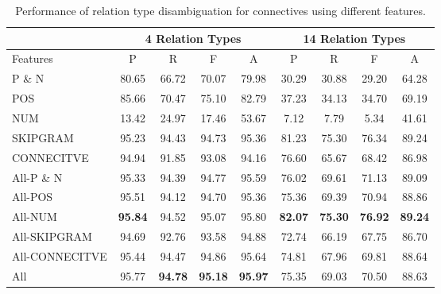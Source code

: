 \begin{table}[ht]
\centering
\begin{tabular}{|l|c|c|c|c|c|c|c|c|}
\hline
                  & \multicolumn{4}{c|}{4 Relation Types}      & \multicolumn{4}{c|}{14 Relation Types}                                    \\ \hline
    Features      &     P         &     R      &     F         &     A         &     P         &     R      &     F        &     A         \\ \hline
    P \& N        &     80.65     &     66.72  &     70.07     &     79.98     &     30.29     &     30.88  &     29.20    &     64.28     \\ \hline
    POS           &     85.66     &     70.47  &     75.10     &     82.79     &     37.23     &     34.13  &     34.70    &     69.19     \\ \hline
    NUM           &     13.42     &     24.97  &     17.46     &     53.67     &      7.12     &      7.79  &      5.34    &     41.61     \\ \hline
    SKIPGRAM      &     95.23     &     94.43  &     94.73     &     95.36     &     81.23     &     75.30  &     76.34    &     89.24     \\ \hline
    CONNECITVE    &     94.94     &     91.85  &     93.08     &     94.16     &     76.60     &     65.67  &     68.42    &     86.98     \\ \hline
    All-P \& N    &     95.33     &     94.39  &     94.77     &     95.59     &     76.02     &     69.61  &     71.13    &     89.09     \\ \hline
    All-POS       &     95.51     &     94.12  &     94.70     &     95.36     &     75.36     &     69.39  &     70.94    &     88.86     \\ \hline
    All-NUM       & \bf 95.84     &     94.52  &     95.07     &     95.80     & \bf 82.07     & \bf 75.30  & \bf 76.92    & \bf 89.24     \\ \hline
    All-SKIPGRAM  &     94.69     &     92.76  &     93.58     &     94.88     &     72.74     &     66.19  &     67.75    &     86.70     \\ \hline
    All-CONNECITVE&     95.44     &     94.47  &     94.86     &     95.64     &     74.81     &     67.96  &     69.81    &     88.64     \\ \hline
    All           &     95.77     & \bf 94.78  & \bf 95.18     & \bf 95.97     &     75.35     &     69.03  &     70.50    &     88.63     \\ \hline

\end{tabular}
\caption{\label{t:sense-features} Performance of relation type
disambiguation for connectives using different features. }
\end{table}

